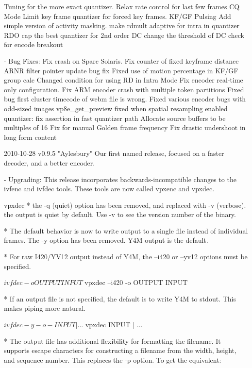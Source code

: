 \begin{DoxyVerbInclude}
        Tuning for the more exact quantizer.
        Relax rate control for last few frames
        CQ Mode
        Limit key frame quantizer for forced key frames.
        KF/GF Pulsing
        Add simple version of activity masking.
        make rdmult adaptive for intra in quantizer RDO
        cap the best quantizer for 2nd order DC
        change the threshold of DC check for encode breakout

  - Bug Fixes:
      Fix crash on Sparc Solaris.
      Fix counter of fixed keyframe distance
      ARNR filter pointer update bug fix
      Fixed use of motion percentage in KF/GF group calc
      Changed condition for using RD in Intra Mode
      Fix encoder real-time only configuration.
      Fix ARM encoder crash with multiple token partitions
      Fixed bug first cluster timecode of webm file is wrong.
      Fixed various encoder bugs with odd-sized images
      vp8e_get_preview fixed when spatial resampling enabled
      quantizer: fix assertion in fast quantizer path
      Allocate source buffers to be multiples of 16
      Fix for manual Golden frame frequency
      Fix drastic undershoot in long form content


2010-10-28 v0.9.5 "Aylesbury"
  Our first named release, focused on a faster decoder, and a better encoder.

  - Upgrading:
    This release incorporates backwards-incompatible changes to the
    ivfenc and ivfdec tools. These tools are now called vpxenc and vpxdec.

    vpxdec
      * the -q (quiet) option has been removed, and replaced with
        -v (verbose). the output is quiet by default. Use -v to see
        the version number of the binary.

      * The default behavior is now to write output to a single file
        instead of individual frames. The -y option has been removed.
        Y4M output is the default.

      * For raw I420/YV12 output instead of Y4M, the --i420 or --yv12
        options must be specified.

          $ ivfdec -o OUTPUT INPUT
          $ vpxdec --i420 -o OUTPUT INPUT

      * If an output file is not specified, the default is to write
        Y4M to stdout. This makes piping more natural.

          $ ivfdec -y -o - INPUT | ...
          $ vpxdec INPUT | ...

      * The output file has additional flexibility for formatting the
        filename. It supports escape characters for constructing a
        filename from the width, height, and sequence number. This
        replaces the -p option. To get the equivalent:


\end{DoxyVerbInclude}
